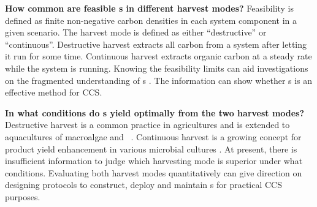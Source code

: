 \documentclass[env.tex]{subfiles}
\begin{document}


\textbf{How common are feasible \pbs s in different harvest modes?}  Feasibility is defined as finite non-negative carbon densities in each system component in a given scenario.  The harvest mode is defined as either ``destructive” or ``continuous”.  Destructive harvest extracts all carbon from a system after letting it run for some time.  Continuous harvest extracts organic carbon at a steady rate while the system is running.  Knowing the feasibility limits can aid investigations on the fragmented understanding of \pbs s \autocite{fuentes2016impact}.  The information can show whether \pbs s is an effective method for CCS.

\textbf{In what conditions do \pbs s yield optimally from the two harvest modes?}  Destructive harvest is a common practice in agricultures and is extended to aquacultures of macroalgae \autocite{duarte2017can} and \phy\  \autocite{evanson_2019}.  Continuous harvest is a growing concept for product yield enhancement in various microbial cultures \autocite{aytekin2016statistical,fuentes2016impact}.  At present, there is insufficient information to judge which harvesting mode is superior under what conditions.  Evaluating both harvest modes quantitatively can give direction on designing protocols to construct, deploy and maintain \pbs s for practical CCS purposes.
\end{document}
